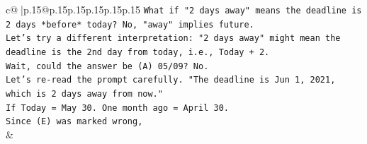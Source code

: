 \documentclass{article}
\begin{document}
{\begin{supertabular}{c@{$\;$}|p{.15\linewidth}@{}p{.15\linewidth}p{.15\linewidth}p{.15\linewidth}p{.15\linewidth}p{.15\linewidth}}
{{{\texttt{What if "2 days away" means the deadline is 2 days *before* today? No, "away" implies future.} \\
\texttt{Let's try a different interpretation: "2 days away" might mean the deadline is the 2nd day from today, i.e., Today + 2.} \\
\texttt{Wait, could the answer be (A) 05/09? No.} \\
\texttt{Let's re{-}read the prompt carefully. "The deadline is Jun 1, 2021, which is 2 days away from now."} \\
\texttt{If Today = May 30. One month ago = April 30.} \\
\texttt{Since (E) was marked wrong,} \\
            }
        }
    }
    & \\ \\

\end{supertabular}
}
\end{document}
